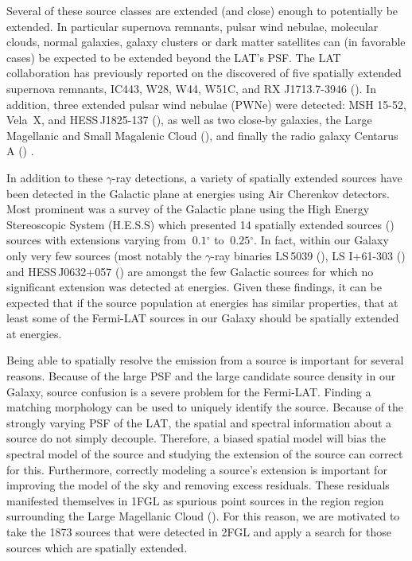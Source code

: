 \documentclass[12pt,preprint]{aastex}
\newcommand{\gev}{\text{GeV}\xspace}
\newcommand{\tev}{\text{TeV}\xspace}
\renewcommand{\deg}{\ensuremath{^\circ}\xspace}
\begin{document}
Several of these source classes are extended (and close) enough to
potentially be extended. In particular supernova remnants, pulsar wind
nebulae, molecular clouds, normal galaxies, galaxy clusters or dark
matter satellites can (in favorable cases) be expected to be extended
beyond the LAT's PSF. The LAT collaboration has previously reported on
the discovered of five spatially extended supernova remnants, IC443,
W28, W44, W51C, and RX J1713.7-3946
(\cite{ic443,w28,w44,w51c,rx_j1713_lat}). In addition, three extended
pulsar wind nebulae (PWNe) were detected: MSH 15-52, Vela~X, and
HESS\,J1825-137 (\cite{msh1552,velax,fermi_hess_j1825}), as well as
two close-by galaxies, the Large Magellanic and Small Magalenic Cloud
(\cite{lmc,smc}), and finally the radio galaxy Centarus A
(\cite{cen_a_lat}) .

In addition to these \gev $\gamma$-ray detections, a variety of
spatially extended sources have been detected in the Galactic plane at
\tev energies using Air Cherenkov detectors. Most prominent was a
survey of the Galactic plane using the High Energy Stereoscopic System
(H.E.S.S) which presented 14 spatially extended sources
(\cite{hess_plane_survey}) sources with extensions varying from
$~0.1\deg$ to $~0.25\deg$. In fact, within our Galaxy only very few
sources (most notably the $\gamma$-ray binaries
LS\,5039 (\cite{HESSLS5039}), LS I+61-303 (\cite{MAGICLSI, VERITASLSI}) and
HESS\,J0632+057 (\cite{HESS0632}) are amongst the few Galactic sources
for which no significant extension was detected at \tev
energies. Given these findings, it can be expected that if the source
population at \gev energies has similar properties, that at least some
of the Fermi-LAT sources in our Galaxy should be spatially extended at
\gev energies.

Being able to spatially resolve the \gev emission from a source is
important for several reasons. Because of the large PSF and the large
candidate source density in our Galaxy, source confusion is a severe
problem for the Fermi-LAT. Finding a matching morphology can be used
to uniquely identify the source.  Because of the strongly varying PSF
of the LAT, the spatial and spectral information about a source do not
simply decouple. Therefore, a biased spatial model will bias the
spectral model of the source and studying the extension of the source
can correct for this.  Furthermore, correctly modeling a source's
extension is important for improving the model of the sky and
removing excess residuals.  These residuals manifested themselves in
1FGL as spurious point sources in the region region surrounding the
Large Magellanic Cloud (\cite{first_cat}).  For this reason, we are
motivated to take the 1873 sources that were detected in 2FGL and
apply a search for those sources which are spatially extended.
\end{document}
